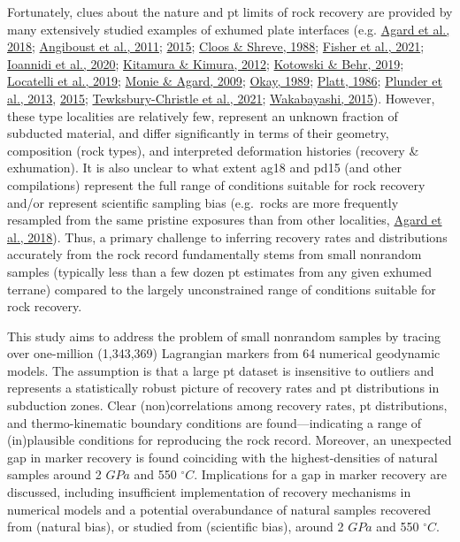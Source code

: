 Fortunately, clues about the nature and \gls{pt} limits of rock recovery are provided by many extensively studied examples of exhumed plate interfaces (e.g. \protect\hyperlink{ref-agard2018}{Agard et al., 2018}; \protect\hyperlink{ref-angiboust2011}{Angiboust et al., 2011}; \protect\hyperlink{ref-angiboust2015}{2015}; \protect\hyperlink{ref-cloos1988}{Cloos \& Shreve, 1988}; \protect\hyperlink{ref-fisher2021}{Fisher et al., 2021}; \protect\hyperlink{ref-ioannidi2020}{Ioannidi et al., 2020}; \protect\hyperlink{ref-kitamura2012}{Kitamura \& Kimura, 2012}; \protect\hyperlink{ref-kotowski2019}{Kotowski \& Behr, 2019}; \protect\hyperlink{ref-locatelli2019}{Locatelli et al., 2019}; \protect\hyperlink{ref-monie2009}{Monie \& Agard, 2009}; \protect\hyperlink{ref-okay1989}{Okay, 1989}; \protect\hyperlink{ref-platt1986}{Platt, 1986}; \protect\hyperlink{ref-plunder2013}{Plunder et al., 2013}, \protect\hyperlink{ref-plunder2015}{2015}; \protect\hyperlink{ref-tewksbury2021a}{Tewksbury-Christle et al., 2021}; \protect\hyperlink{ref-wakabayashi2015}{Wakabayashi, 2015}). However, these type localities are relatively few, represent an unknown fraction of subducted material, and differ significantly in terms of their geometry, composition (rock types), and interpreted deformation histories (recovery \& exhumation). It is also unclear to what extent ag18 and pd15 (and other compilations) represent the full range of conditions suitable for rock recovery and/or represent scientific sampling bias (e.g.~rocks are more frequently resampled from the same pristine exposures than from other localities, \protect\hyperlink{ref-agard2018}{Agard et al., 2018}). Thus, a primary challenge to inferring recovery rates and distributions accurately from the rock record fundamentally stems from small nonrandom samples (typically less than a few dozen \gls{pt} estimates from any given exhumed terrane) compared to the largely unconstrained range of conditions suitable for rock recovery.

This study aims to address the problem of small nonrandom samples by tracing over one-million (1,343,369) Lagrangian markers from 64 numerical geodynamic models. The assumption is that a large \gls{pt} dataset is insensitive to outliers and represents a statistically robust picture of recovery rates and \gls{pt} distributions in subduction zones. Clear (non)correlations among recovery rates, \gls{pt} distributions, and thermo-kinematic boundary conditions are found---indicating a range of (in)plausible conditions for reproducing the rock record. Moreover, an unexpected gap in marker recovery is found coinciding with the highest-densities of natural samples around 2 \(GPa\) and 550 \(^\circ C\). Implications for a gap in marker recovery are discussed, including insufficient implementation of recovery mechanisms in numerical models and a potential overabundance of natural samples recovered from (natural bias), or studied from (scientific bias), around 2 \(GPa\) and 550 \(^\circ C\).

